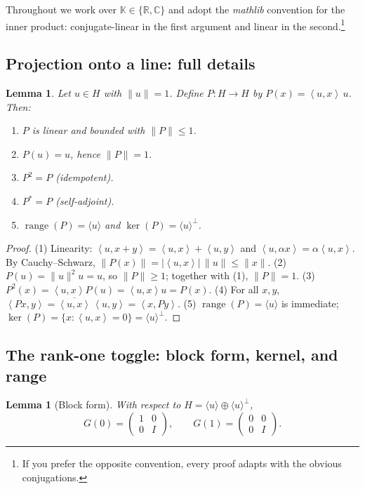 \documentclass[11pt]{article}
\newtheorem{lemma}[theorem]{Lemma}
\theoremstyle{definition}
\newcommand{\K}{\mathbb{K}}
\newcommand{\R}{\mathbb{R}}
\newcommand{\C}{\mathbb{C}}
\newcommand{\ip}[2]{\left\langle #1,#2\right\rangle}
\DeclareMathOperator{\range}{range}
\DeclareMathOperator{\kerop}{ker}
\begin{document}
Throughout we work over $\K\in\{\R,\C\}$ and adopt the \emph{mathlib} convention for the inner product: conjugate-linear in the first argument and linear in the second.\footnote{If you prefer the opposite convention, every proof adapts with the obvious conjugations.}

\subsection{Projection onto a line: full details}

\begin{lemma}\label{lem:proj-details}
Let $u\in H$ with $\|u\|=1$. Define $P:H\to H$ by $P(x)=\ip{u}{x}\,u$. Then:
\begin{enumerate}
\item $P$ is linear and bounded with $\|P\|\le 1$.
\item $P(u)=u$, hence $\|P\|=1$.
\item $P^2=P$ (idempotent).
\item $P^\ast=P$ (self-adjoint).
\item $\range(P)=\langle u\rangle$ and $\kerop(P)=\langle u\rangle^\perp$.
\end{enumerate}
\end{lemma}

\begin{proof}
(1) Linearity: $\ip{u}{x+y}=\ip{u}{x}+\ip{u}{y}$ and $\ip{u}{\alpha x}=\alpha\ip{u}{x}$. By Cauchy--Schwarz,
$\|P(x)\|=|\ip{u}{x}|\,\|u\|\le \|x\|$.
(2) $P(u)=\|u\|^2u=u$, so $\|P\|\ge 1$; together with (1), $\|P\|=1$.
(3) $P^2(x)=\ip{u}{x}P(u)=\ip{u}{x}u=P(x)$.
(4) For all $x,y$, $\ip{Px}{y}=\overline{\ip{u}{x}}\,\ip{u}{y}=\ip{x}{Py}$.
(5) $\range(P)=\langle u\rangle$ is immediate; $\kerop(P)=\{x:\ip{u}{x}=0\}=\langle u\rangle^\perp$.
\end{proof}

\subsection{The rank-one toggle: block form, kernel, and range}

\begin{lemma}[Block form]\label{lem:block-human}
With respect to $H=\langle u\rangle\oplus \langle u\rangle^\perp$,
\[
G(0)=\begin{pmatrix}1&0\\[2pt]0&I\end{pmatrix},\qquad
G(1)=\begin{pmatrix}0&0\\[2pt]0&I\end{pmatrix}.
\]
\end{lemma}
\end{document}
